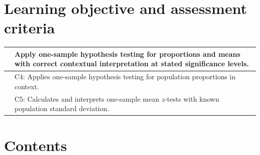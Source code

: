 \section*{Learning objective and assessment criteria}
\begin{tabular}{|Y|Z|}
\hline
{} & Apply one-sample hypothesis testing for proportions and means with correct contextual interpretation at stated significance levels. \\
\hline
{} & C4: Applies one-sample hypothesis testing for population proportions in context.\\
& C5: Calculates and interprets one-sample mean \(z\)-tests with known population standard deviation. \\
\hline
\end{tabular}

\vspace{0.3cm}
\section*{Contents}
\setcounter{tocdepth}{2}
\setcounter{secnumdepth}{1}
\tableofcontents

